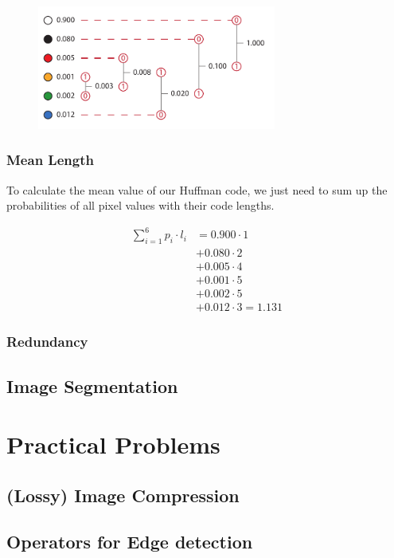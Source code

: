 \documentclass[a4paper,12pt]{article}
\begin{document}
	\begin{figure}[h!]
		\centering
		\includegraphics[width=0.7\textwidth]{huffman.pdf}
	\end{figure}
	
	\subsubsection{Mean Length}
	
	To calculate the mean value of our Huffman code, we just need to sum up the probabilities of all pixel values with their code lengths.
	
	\begin{align*}
		\sum\limits_{i = 1}^6 p_i \cdot l_i 	&= 0.900 \cdot 1\\
												&+ 0.080 \cdot 2\\
												&+ 0.005 \cdot 4\\
												&+ 0.001 \cdot 5\\
												&+ 0.002 \cdot 5\\
												&+ 0.012 \cdot 3 = 1.131
	\end{align*}
	
	\subsubsection{Redundancy}
	
	\subsection{Image Segmentation}

	\section{Practical Problems}
	\subsection{(Lossy) Image Compression}
	\subsection{Operators for Edge detection}
\end{document}
